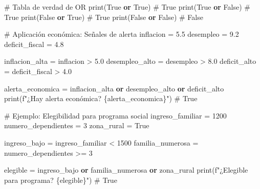 \documentclass[
  doc,
  floatsintext,
  longtable,
  a4paper,
  nolmodern,
  notxfonts,
  notimes,
  12pt,
  colorlinks=true,linkcolor=blue,citecolor=blue,urlcolor=blue]{apa7}
\newenvironment{Shaded}{\begin{snugshade}}{\end{snugshade}}
\newcommand{\BuiltInTok}[1]{\textcolor[rgb]{0.00,0.23,0.31}{#1}}
\newcommand{\CommentTok}[1]{\textcolor[rgb]{0.37,0.37,0.37}{#1}}
\newcommand{\DecValTok}[1]{\textcolor[rgb]{0.68,0.00,0.00}{#1}}
\newcommand{\FloatTok}[1]{\textcolor[rgb]{0.68,0.00,0.00}{#1}}
\newcommand{\KeywordTok}[1]{\textcolor[rgb]{0.00,0.23,0.31}{\textbf{#1}}}
\newcommand{\NormalTok}[1]{\textcolor[rgb]{0.00,0.23,0.31}{#1}}
\newcommand{\OperatorTok}[1]{\textcolor[rgb]{0.37,0.37,0.37}{#1}}
\newcommand{\SpecialCharTok}[1]{\textcolor[rgb]{0.37,0.37,0.37}{#1}}
\newcommand{\SpecialStringTok}[1]{\textcolor[rgb]{0.13,0.47,0.30}{#1}}
\newcommand{\VariableTok}[1]{\textcolor[rgb]{0.07,0.07,0.07}{#1}}
\begin{document}
\begin{Shaded}
\begin{Highlighting}[]
\CommentTok{\# Tabla de verdad de OR}
\BuiltInTok{print}\NormalTok{(}\VariableTok{True} \KeywordTok{or} \VariableTok{True}\NormalTok{)     }\CommentTok{\# True}
\BuiltInTok{print}\NormalTok{(}\VariableTok{True} \KeywordTok{or} \VariableTok{False}\NormalTok{)    }\CommentTok{\# True}
\BuiltInTok{print}\NormalTok{(}\VariableTok{False} \KeywordTok{or} \VariableTok{True}\NormalTok{)    }\CommentTok{\# True}
\BuiltInTok{print}\NormalTok{(}\VariableTok{False} \KeywordTok{or} \VariableTok{False}\NormalTok{)   }\CommentTok{\# False}

\CommentTok{\# Aplicación económica: Señales de alerta}
\NormalTok{inflacion }\OperatorTok{=} \FloatTok{5.5}
\NormalTok{desempleo }\OperatorTok{=} \FloatTok{9.2}
\NormalTok{deficit\_fiscal }\OperatorTok{=} \FloatTok{4.8}

\NormalTok{inflacion\_alta }\OperatorTok{=}\NormalTok{ inflacion }\OperatorTok{\textgreater{}} \FloatTok{5.0}
\NormalTok{desempleo\_alto }\OperatorTok{=}\NormalTok{ desempleo }\OperatorTok{\textgreater{}} \FloatTok{8.0}
\NormalTok{deficit\_alto }\OperatorTok{=}\NormalTok{ deficit\_fiscal }\OperatorTok{\textgreater{}} \FloatTok{4.0}

\NormalTok{alerta\_economica }\OperatorTok{=}\NormalTok{ inflacion\_alta }\KeywordTok{or}\NormalTok{ desempleo\_alto }\KeywordTok{or}\NormalTok{ deficit\_alto}
\BuiltInTok{print}\NormalTok{(}\SpecialStringTok{f"¿Hay alerta económica? }\SpecialCharTok{\{}\NormalTok{alerta\_economica}\SpecialCharTok{\}}\SpecialStringTok{"}\NormalTok{)  }\CommentTok{\# True}

\CommentTok{\# Ejemplo: Elegibilidad para programa social}
\NormalTok{ingreso\_familiar }\OperatorTok{=} \DecValTok{1200}
\NormalTok{numero\_dependientes }\OperatorTok{=} \DecValTok{3}
\NormalTok{zona\_rural }\OperatorTok{=} \VariableTok{True}

\NormalTok{ingreso\_bajo }\OperatorTok{=}\NormalTok{ ingreso\_familiar }\OperatorTok{\textless{}} \DecValTok{1500}
\NormalTok{familia\_numerosa }\OperatorTok{=}\NormalTok{ numero\_dependientes }\OperatorTok{\textgreater{}=} \DecValTok{3}

\NormalTok{elegible }\OperatorTok{=}\NormalTok{ ingreso\_bajo }\KeywordTok{or}\NormalTok{ familia\_numerosa }\KeywordTok{or}\NormalTok{ zona\_rural}
\BuiltInTok{print}\NormalTok{(}\SpecialStringTok{f"¿Elegible para programa? }\SpecialCharTok{\{}\NormalTok{elegible}\SpecialCharTok{\}}\SpecialStringTok{"}\NormalTok{)  }\CommentTok{\# True}
\end{Highlighting}
\end{Shaded}
\end{document}

